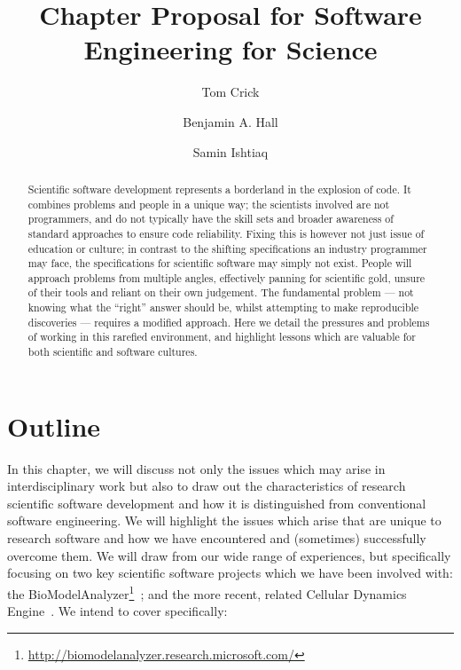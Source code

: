 \documentclass[a4paper,11pt]{article}
\title{Chapter Proposal for Software Engineering for Science}
\author[1]{Tom Crick}
\author[2]{Benjamin A. Hall}
\author[3]{Samin Ishtiaq}
\affil[1]{Department of Computing \& Information Systems, Cardiff
  Metropolitan University, UK}
\affil[2]{MRC Cancer Unit, University of Cambridge, UK}
\affil[3]{Microsoft Research Cambridge, UK}
\affil[1]{\protect\url{tcrick@cardiffmet.ac.uk}}
\affil[2]{\protect\url{bh418@mrc-cu.cam.ac.uk}}
\affil[3]{\protect\url{samin.ishtiaq@microsoft.com}}
\date{ }
\begin{document}
\maketitle

\begin{abstract}
Scientific software development represents a borderland in the
explosion of code. It combines problems and people in a unique way;
the scientists involved are not programmers, and do not typically have
the skill sets and broader awareness of standard approaches to ensure
code reliability.  Fixing this is however not just issue of education
or culture; in contrast to the shifting specifications an industry
programmer may face, the specifications for scientific software may
simply not exist. People will approach problems from multiple angles,
effectively panning for scientific gold, unsure of their tools and
reliant on their own judgement.  The fundamental problem --- not
knowing what the ``right'' answer should be, whilst attempting to make
reproducible discoveries --- requires a modified approach. Here we
detail the pressures and problems of working in this rarefied
environment, and highlight lessons which are valuable for both
scientific and software cultures.
\end{abstract}

\section*{Outline}

In this chapter, we will discuss not only the issues which may arise
in interdisciplinary work but also to draw out the characteristics of
research scientific software development and how it is distinguished
from conventional software engineering. We will highlight the issues
which arise that are unique to research software and how we have
encountered and (sometimes) successfully overcome them. We will draw
from our wide range of experiences, but specifically focusing on two
key scientific software projects which we have been involved with: the
BioModelAnalyzer\footnote{\url{http://biomodelanalyzer.research.microsoft.com/}}~\cite{benque-et-al:2012};
and the more recent, related Cellular Dynamics
Engine~\cite{hall-et-al:2015}. We intend to cover specifically:
\end{document}
